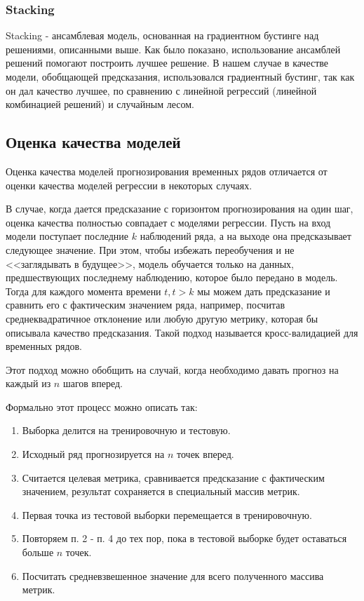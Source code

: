 \documentclass[a4paper,article,14pt]{extarticle}
\begin{document}
\subsubsection{Stacking}
Stacking - ансамблевая модель, основанная на градиентном бустинге над решениями, описанными выше.
Как было показано, использование ансамблей решений помогают построить лучшее решение.
В нашем случае в качестве модели, обобщающей предсказания, использовался градиентный бустинг, так как он дал качество лучшее, по сравнению с линейной регрессий (линейной комбинацией решений) и случайным лесом. %


\subsection{Оценка качества моделей}

Оценка качества моделей прогнозирования временных рядов отличается от оценки качества моделей регрессии в некоторых случаях.
\par
В случае, когда дается предсказание с горизонтом прогнозирования на один шаг, оценка качества полностью совпадает с моделями регрессии.
Пусть на вход модели поступает последние $k$ наблюдений ряда, а на выходе она предсказывает следующее значение.
При этом, чтобы избежать переобучения и не <<заглядывать в будущее>>, модель обучается только на данных, предшествующих последнему наблюдению, которое было передано в модель.
Тогда для каждого момента времени $t, t > k$ мы можем дать предсказание и сравнить его с фактическим значением ряда, например, посчитав среднеквадратичное отклонение или любую другую метрику, которая бы описывала качество предсказания.
Такой подход называется кросс-валидацией для временных рядов.
\par
Этот подход можно обобщить на случай, когда необходимо давать прогноз на каждый из $n$ шагов вперед.

Формально этот процесс можно описать так:

\begin{enumerate}
    \item Выборка делится на тренировочную и тестовую.
    \item Исходный ряд прогнозируется на $n$ точек вперед.
    \item Считается целевая метрика, сравнивается предсказание с фактическим значением, результат сохраняется в специальный массив метрик.
    \item Первая точка из тестовой выборки перемещается в тренировочную.
    \item Повторяем п. 2 - п. 4 до тех пор, пока в тестовой выборке будет оставаться больше $n$ точек.
    \item Посчитать средневзвешенное значение для всего полученного массива метрик.
\end{enumerate}
\end{document}
